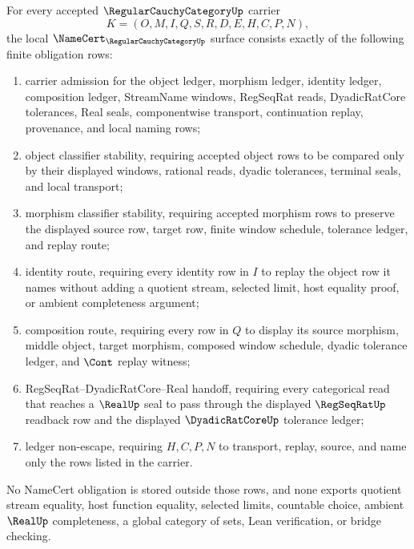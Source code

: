 \begin{theorem}
\label{thm:regular-cauchy-category-namecert-obligations}
For every accepted $\RegularCauchyCategoryUp$ carrier
$$
K=(O,M,I,Q,S,R,D,E,H,C,P,N),
$$
the local $\NameCert_{\RegularCauchyCategoryUp}$ surface consists exactly of the following finite obligation rows:
\begin{enumerate}
\item carrier admission for the object ledger, morphism ledger, identity ledger, composition ledger, StreamName windows, RegSeqRat reads, DyadicRatCore tolerances, Real seals, componentwise transport, continuation replay, provenance, and local naming rows;
\item object classifier stability, requiring accepted object rows to be compared only by their displayed windows, rational reads, dyadic tolerances, terminal seals, and local transport;
\item morphism classifier stability, requiring accepted morphism rows to preserve the displayed source row, target row, finite window schedule, tolerance ledger, and replay route;
\item identity route, requiring every identity row in $I$ to replay the object row it names without adding a quotient stream, selected limit, host equality proof, or ambient completeness argument;
\item composition route, requiring every row in $Q$ to display its source morphism, middle object, target morphism, composed window schedule, dyadic tolerance ledger, and $\Cont$ replay witness;
\item RegSeqRat--DyadicRatCore--Real handoff, requiring every categorical read that reaches a $\RealUp$ seal to pass through the displayed $\RegSeqRatUp$ readback row and the displayed $\DyadicRatCoreUp$ tolerance ledger;
\item ledger non-escape, requiring $H,C,P,N$ to transport, replay, source, and name only the rows listed in the carrier.
\end{enumerate}
No NameCert obligation is stored outside those rows, and none exports quotient stream equality, host function equality, selected limits, countable choice, ambient $\RealUp$ completeness, a global category of sets, Lean verification, or bridge checking.
\end{theorem}
